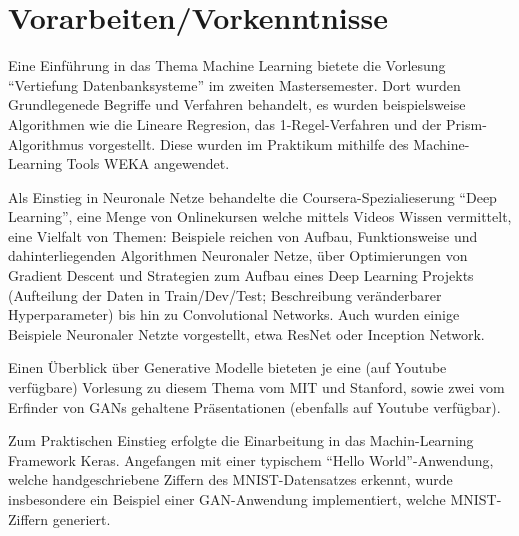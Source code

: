 \chapter*{Vorarbeiten/Vorkenntnisse}
Eine Einführung in das Thema Machine Learning bietete die Vorlesung "`Vertiefung Datenbanksysteme"'
im zweiten Mastersemester.
Dort wurden Grundlegenede Begriffe und Verfahren behandelt, es wurden beispielsweise 
Algorithmen wie die Lineare Regresion, das 1-Regel-Verfahren und der Prism-Algorithmus
vorgestellt. Diese wurden im Praktikum mithilfe des Machine-Learning Tools WEKA\cite{weka} 
angewendet.

Als Einstieg in Neuronale Netze behandelte die Coursera-Spezialieserung "`Deep Learning"'\cite{coursera}, eine Menge von Onlinekursen welche mittels Videos
Wissen vermittelt, 
eine Vielfalt von Themen: Beispiele reichen von Aufbau, Funktionsweise und dahinterliegenden Algorithmen Neuronaler Netze,
über Optimierungen von Gradient Descent und
Strategien zum Aufbau eines Deep Learning Projekts 
(Aufteilung der Daten in Train/Dev/Test; Beschreibung veränderbarer Hyperparameter)
bis hin zu Convolutional Networks.
Auch wurden einige Beispiele Neuronaler Netzte vorgestellt, etwa ResNet oder Inception Network.

Einen Überblick über Generative Modelle bieteten je eine (auf Youtube verfügbare) Vorlesung zu diesem Thema vom MIT\cite{mit} und Stanford\cite{stan},
sowie zwei vom Erfinder von GANs gehaltene Präsentationen\cite{goodf1}\cite{goodf2} (ebenfalls auf Youtube verfügbar).

Zum Praktischen Einstieg erfolgte die Einarbeitung in das Machin-Learning Framework Keras\cite{Keras}.
Angefangen mit einer typischem "`Hello World"'-Anwendung, welche handgeschriebene Ziffern des MNIST-Datensatzes erkennt, 
wurde insbesondere ein Beispiel einer GAN-Anwendung\cite{ganex} implementiert, welche MNIST-Ziffern generiert.